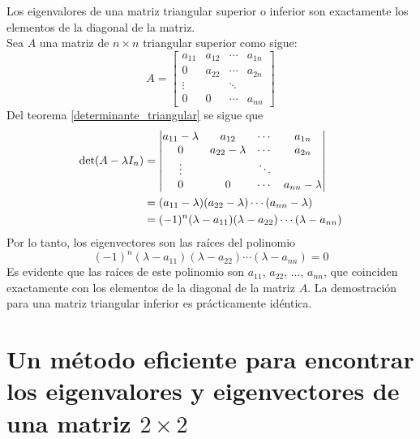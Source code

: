\begin{theorem}
    Los eigenvalores de una matriz triangular superior o inferior son exactamente los elementos de la diagonal de la matriz. \\
    \demostracion Sea $A$ una matriz de $n \times n$ triangular superior como sigue:
    $$A = \begin{bmatrix}
        a_{11} & a_{12} & \cdots & a_{1n} \\
        0 & a_{22} & \cdots & a_{2n} \\
        \vdots & & \ddots & \\
        0 & 0 & \cdots & a_{nn}
    \end{bmatrix}$$
    Del teorema \ref{determinante_triangular} se sigue que
    \begin{align*}
        \operatorname{det} (A - \lambda I_n) & = \begin{vmatrix}
            a_{11} - \lambda & a_{12} & \cdots & a_{1n} \\
            0 & a_{22} - \lambda & \cdots & a_{2n} \\
            \vdots & & \ddots & \\
            0 & 0 & \cdots & a_{nn} - \lambda
        \end{vmatrix} \\
        & = (a_{11} - \lambda)(a_{22} - \lambda) \cdots (a_{nn} - \lambda) \\
        & = (-1)^n (\lambda - a_{11})(\lambda - a_{22}) \cdots (\lambda - a_{nn})
    \end{align*}
    Por lo tanto, los eigenvectores son las raíces del polinomio
    $$(-1)^n (\lambda - a_{11})(\lambda - a_{22}) \cdots (\lambda - a_{nn}) = 0$$
    Es evidente que las raíces de este polinomio son $a_{11}$, $a_{22}$, $\dots$, $a_{nn}$, que coinciden exactamente con los elementos de la diagonal de la matriz $A$. La demostración para una matriz triangular inferior es prácticamente idéntica.
\end{theorem}

\newpage

\section*{Un método eficiente para encontrar los eigenvalores y eigenvectores de una matriz {\boldmath$2 \times 2$}}\label{metodo_eigen_2x2}

